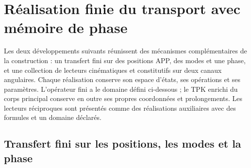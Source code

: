 \section{Réalisation finie du transport avec mémoire de phase}
\label{iii:hist:antecedentes}

Les deux développements suivants réunissent des mécanismes complémentaires de la
construction : un transfert fini sur des positions APP, des modes et une phase,
et une collection de lecteurs cinématiques et constitutifs sur deux canaux
angulaires. Chaque réalisation conserve son espace d’états, ses opérations
et ses paramètres. L’opérateur fini a le domaine défini
ci-dessous ; le TPK enrichi du corps principal conserve en outre ses
propres coordonnées et prolongements. Les lecteurs réciproques sont présentés
comme des réalisations auxiliaires avec des formules et un domaine déclarés.

\subsection{Transfert fini sur les positions, les modes et la phase}
\label{iii:hist:transferencia}

